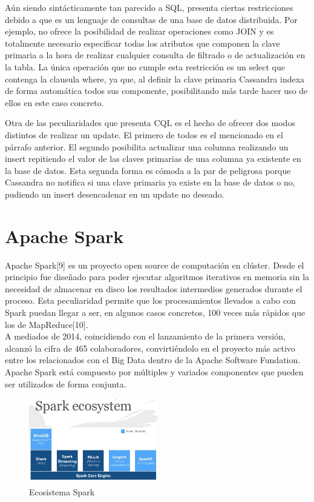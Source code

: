 Aún siendo sintácticamente  tan parecido a SQL, presenta ciertas restricciones debido a que es un lenguaje de consultas de una base de datos distribuida. Por ejemplo, no ofrece la posibilidad de realizar operaciones como JOIN y es totalmente necesario especificar todas los atributos que componen la clave primaria a la hora de realizar cualquier consulta de filtrado o de actualización en la tabla. La única operación que no cumple esta restricción es un select que contenga la clausula where, ya que, al definir la clave primaria Cassandra indexa de forma automática todos sus componente, posibilitando más tarde  hacer uso de ellos en este caso concreto.

Otra de las peculiaridades que presenta CQL es el hecho de ofrecer dos modos distintos de realizar un update. El primero de todos es el mencionado en el párrafo anterior. El segundo posibilita actualizar una columna realizando un insert repitiendo el valor de las claves primarias de una columna ya existente en la base de datos. Esta segunda forma es cómoda a la par de peligrosa porque Cassandra no notifica si una clave primaria ya existe en la base de datos o no, pudiendo un insert desencadenar en un update no deseado.  

\section{Apache Spark}

Apache Spark[9] es un proyecto open source de computación en clúster. Desde el principio fue diseñado para poder ejecutar algoritmos iterativos en memoria sin la necesidad de almacenar en disco los resultados intermedios generados durante el proceso. Esta peculiaridad permite que los procesamientos llevados a cabo con Spark puedan llegar a ser, en algunos casos concretos, 100 veces más rápidos que los de MapReduce[10].\\

A mediados de 2014, coincidiendo con el lanzamiento de la primera versión, alcanzó la cifra de 465 colaboradores, convirtiéndolo en el proyecto más activo entre los relacionados con el Big Data dentro de la Apache Software Fundation.\\

Apache Spark está compuesto por múltiples y variados componentes que pueden ser utilizados de forma conjunta.\\

\begin{figure}[h]
	\centering
	\includegraphics[width=0.5\textwidth]{Ilustraciones/spark_ecosystem.png}
	\caption{Ecosistema Spark}
	\label{fig:ipanel}
\end{figure}

